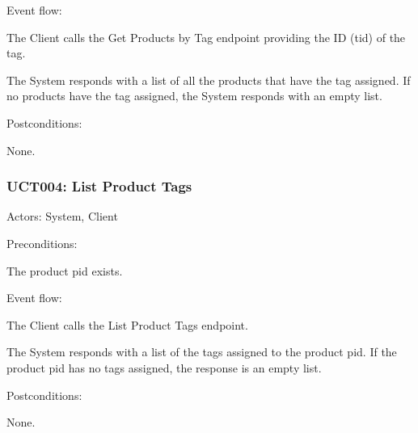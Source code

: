 Event flow:

\ucitem The Client calls the Get Products by Tag endpoint providing the ID (tid) of the tag.

\ucitem The System responds with a list of all the products that have the tag assigned. If no products have the tag assigned, the System responds with an empty list.

Postconditions:

\ucitem None.

\subsubsection{UCT004: List Product Tags}
\label{UCT004}

Actors: System, Client

Preconditions: 

\ucitem The product pid exists.

Event flow:

\ucitem The Client calls the List Product Tags endpoint.

\ucitem The System responds with a list of the tags assigned to the product pid. If the product pid has no tags assigned, the response is an empty list.

Postconditions: 

\ucitem None.
